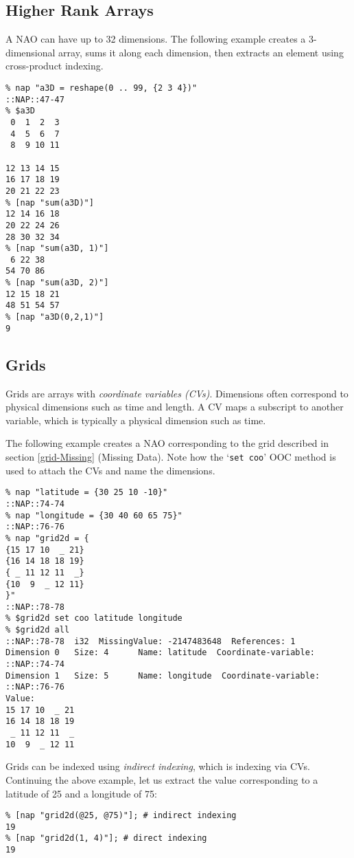 \subsection{Higher Rank Arrays}
    \label{array-Higher}

A NAO can have up to 32 dimensions. The following example
  creates a 3-dimensional array, sums it along each dimension, then
  extracts an element using cross-product indexing.
  \begin{verbatim}
% nap "a3D = reshape(0 .. 99, {2 3 4})"
::NAP::47-47
% $a3D 
 0  1  2  3
 4  5  6  7
 8  9 10 11

12 13 14 15
16 17 18 19
20 21 22 23
% [nap "sum(a3D)"]
12 14 16 18
20 22 24 26
28 30 32 34
% [nap "sum(a3D, 1)"]
 6 22 38
54 70 86
% [nap "sum(a3D, 2)"]
12 15 18 21
48 51 54 57
% [nap "a3D(0,2,1)"]
9
\end{verbatim}

\subsection{Grids}
    \label{array-Grids}

Grids are arrays with 
  \emph{coordinate variables (CVs)}. Dimensions often correspond to
  physical dimensions such as time and length. A CV maps a subscript to
  another variable, which is typically a physical dimension such as
  time.
  

The following example creates a NAO corresponding to the grid
  described in section \ref{grid-Missing} (Missing Data).
Note how the `\texttt{set coo}' OOC method is used to attach the CVs and
  name the dimensions.
  \begin{verbatim}
% nap "latitude = {30 25 10 -10}"
::NAP::74-74
% nap "longitude = {30 40 60 65 75}"
::NAP::76-76
% nap "grid2d = {
{15 17 10  _ 21}
{16 14 18 18 19}
{ _ 11 12 11  _}
{10  9  _ 12 11}
}"
::NAP::78-78
% $grid2d set coo latitude longitude
% $grid2d all
::NAP::78-78  i32  MissingValue: -2147483648  References: 1
Dimension 0   Size: 4      Name: latitude  Coordinate-variable: ::NAP::74-74
Dimension 1   Size: 5      Name: longitude  Coordinate-variable: ::NAP::76-76
Value:
15 17 10  _ 21
16 14 18 18 19
 _ 11 12 11  _
10  9  _ 12 11
\end{verbatim}

Grids can be indexed using 
  \emph{indirect indexing}, which is indexing via CVs. Continuing the
  above example, let us extract the value corresponding to a latitude
  of 25 and a longitude of 75:
  \begin{verbatim}
% [nap "grid2d(@25, @75)"]; # indirect indexing
19
% [nap "grid2d(1, 4)"]; # direct indexing
19
\end{verbatim}


